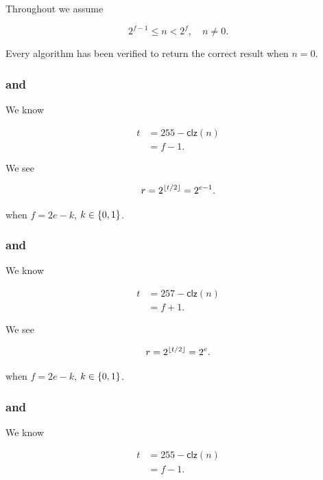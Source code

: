 Throughout we assume

\begin{equation}
    2^{f-1} \le n < 2^{f}, \quad n\ne0.
\end{equation}

\noindent
Every algorithm has been verified to return the correct result
when $n=0$.

\subsubsection{\UnrolledOne{} and \WhileOne{}}
\label{app:initializations:unrolled1}

We know

\begin{align}
    t &= 255 - \textsf{clz}(n) \nonumber\\
        &= f-1.
\end{align}

\noindent
We see

\begin{equation}
    r = 2^{\left\lfloor t/2 \right\rfloor} = 2^{e-1}.
\end{equation}

\noindent
when $f = 2e-k$, $k\in\left\{ 0,1 \right\}$.

\subsubsection{\UnrolledTwo{} and \WhileTwo{}}
\label{app:initializations:unrolled2}

We know

\begin{align}
    t &= 257 - \textsf{clz}(n) \nonumber\\
        &= f+1.
\end{align}

\noindent
We see

\begin{equation}
    r = 2^{\left\lfloor t/2 \right\rfloor} = 2^{e}.
\end{equation}

\noindent
when $f = 2e-k$, $k\in\left\{ 0,1 \right\}$.

\subsubsection{\UnrolledThree{} and \WhileThree{}}
\label{app:initializations:unrolled3}

We know

\begin{align}
    t &= 255 - \textsf{clz}(n) \nonumber\\
        &= f-1.
\end{align}

